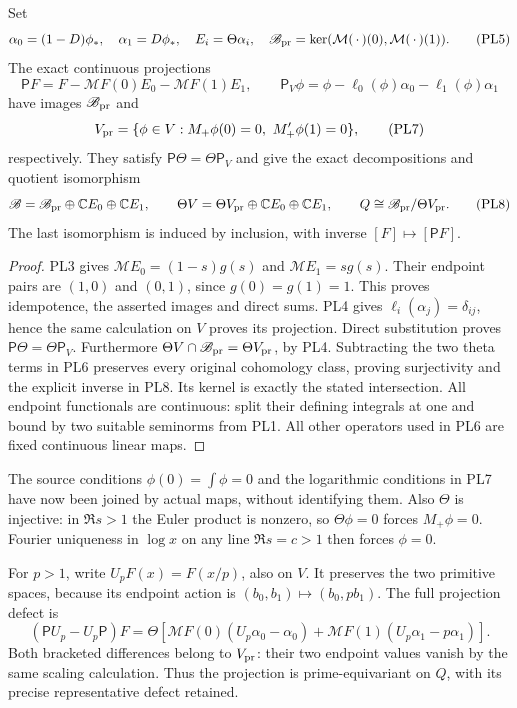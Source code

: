 \begin{theorem}
\label{pl:thm:universal}
Set
\[
 \alpha_0=(1-D)\phi_*,\quad\alpha_1=D\phi_*,
 \quad E_i=\Theta\alpha_i,\quad
 \mathscr B_{\rm pr}=\ker(\mathcal M(\,\cdot\,)(0),\mathcal M(\,\cdot\,)(1)).
 \tag{PL5}
\]
The exact continuous projections
\[
 \mathsf P F=F-\mathcal M F(0)E_0-\mathcal M F(1)E_1,\qquad
 \mathsf P_V\phi=\phi-\ell_0(\phi)\alpha_0-\ell_1(\phi)\alpha_1
 \tag{PL6}\label{pl:pl:projection}
\]
have images \(\mathscr B_{\rm pr}\) and
\[
 V_{\rm pr}=\{\phi\in V:M_+\phi(0)=0,\ M_+'\phi(1)=0\},
 \tag{PL7}
\]
respectively. They satisfy \(\mathsf P\Theta=\Theta\mathsf P_V\) and
give the exact decompositions and quotient isomorphism
\[
 \mathscr B=\mathscr B_{\rm pr}\oplus\mathbb C E_0\oplus\mathbb C E_1,\qquad
 \Theta V=\Theta V_{\rm pr}\oplus\mathbb C E_0\oplus\mathbb C E_1,\qquad
 Q\cong\mathscr B_{\rm pr}/\Theta V_{\rm pr}.
 \tag{PL8}\label{pl:pl:quotient}
\]
The last isomorphism is induced by inclusion, with inverse
\([F]\mapsto[\mathsf P F]\).
\end{theorem}
\begin{proof}
PL3 gives \(\mathcal M E_0=(1-s)g(s)\) and \(\mathcal M E_1=sg(s)\).
Their endpoint pairs are \((1,0)\) and \((0,1)\), since \(g(0)=g(1)=1\).
This proves idempotence, the asserted images and direct sums.
PL4 gives \(\ell_i(\alpha_j)=\delta_{ij}\), hence the same calculation
on \(V\) proves its projection. Direct substitution proves
\(\mathsf P\Theta=\Theta\mathsf P_V\).
Furthermore \(\Theta V\cap\mathscr B_{\rm pr}=\Theta V_{\rm pr}\), by PL4.
Subtracting the two theta terms in PL6 preserves every original
cohomology class, proving surjectivity and the explicit inverse in
PL8. Its kernel is exactly the stated intersection.
All endpoint functionals are continuous: split their defining
integrals at one and bound by two suitable seminorms from PL1.
All other operators used in PL6 are fixed continuous linear maps.
\end{proof}

The source conditions \(\phi(0)=\int\phi=0\) and the logarithmic
conditions in PL7 have now been joined by actual maps, without
identifying them. Also \(\Theta\) is injective: in \(\Re s>1\) the
Euler product is nonzero, so \(\Theta\phi=0\) forces \(M_+\phi=0\).
Fourier uniqueness in \(\log x\) on any line \(\Re s=c>1\) then
forces \(\phi=0\).

For \(p>1\), write \(U_pF(x)=F(x/p)\), also on \(V\).
It preserves the two primitive spaces, because its endpoint action is
\((b_0,b_1)\mapsto(b_0,pb_1)\). The full projection defect is
\[
 (\mathsf P U_p-U_p\mathsf P)F
 =\Theta\!\left[
 \mathcal M F(0)(U_p\alpha_0-\alpha_0)
 +\mathcal M F(1)(U_p\alpha_1-p\alpha_1)\right].
 \tag{PL9}\label{pl:pl:projection-defect}
\]
Both bracketed differences belong to \(V_{\rm pr}\): their two
endpoint values vanish by the same scaling calculation. Thus the
projection is prime-equivariant on \(Q\), with its precise
representative defect retained.

